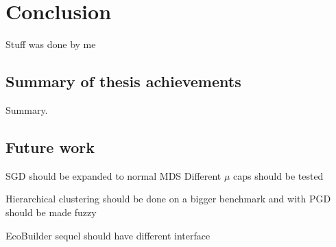 \chapter{Conclusion}
\label{chap:conclusion}

Stuff was done by me

\section{Summary of thesis achievements}

Summary.

\section{Future work}

SGD should be expanded to normal MDS
Different $\mu$ caps should be tested

Hierarchical clustering should be done on a bigger benchmark and with
PGD should be made fuzzy

EcoBuilder sequel should have different interface

